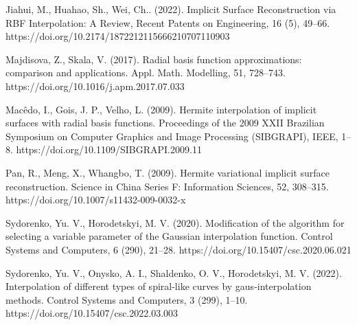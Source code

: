 \documentclass[12pt,a4paper]{article}
\begin{document}
\par
Jiahui, M., Huahao, Sh., Wei, Ch.. (2022). Implicit Surface Reconstruction via RBF Interpolation: A Review, Recent Patents on Engineering, 16 (5), 49–66. https://doi.org/10.2174/1872212115666210707110903
\par
Majdisova, Z., Skala, V. (2017). Radial basis function approximations: comparison and applications. Appl. Math. Modelling, 51, 728–743. https://doi.org/10.1016/j.apm.2017.07.033
\par
Macêdo, I., Gois, J. P., Velho, L. (2009). Hermite interpolation of implicit surfaces with radial basis functions. Proceedings of the 2009 XXII Brazilian Symposium on Computer Graphics and Image Processing (SIBGRAPI), IEEE, 1–8. https://doi.org/10.1109/SIBGRAPI.2009.11
\par
Pan, R., Meng, X., Whangbo, T. (2009). Hermite variational implicit surface reconstruction. Science in China Series F: Information Sciences, 52, 308–315. https://doi.org/10.1007/s11432-009-0032-x
\par
Sydorenko, Yu. V., Horodetskyi, M. V. (2020). Modification of the algorithm for selecting a variable parameter of the Gaussian interpolation function. Control Systems and Computers, 6 (290), 21–28. https://doi.org/10.15407/csc.2020.06.021
\par
Sydorenko, Yu. V., Onysko, A. I., Shaldenko, O. V., Horodetskyi, M. V. (2022). Interpolation of different types of spiral-like curves by gaus-interpolation methods. Control Systems and Computers, 3 (299), 1–10. https://doi.org/10.15407/csc.2022.03.003
\par
\end{document}
